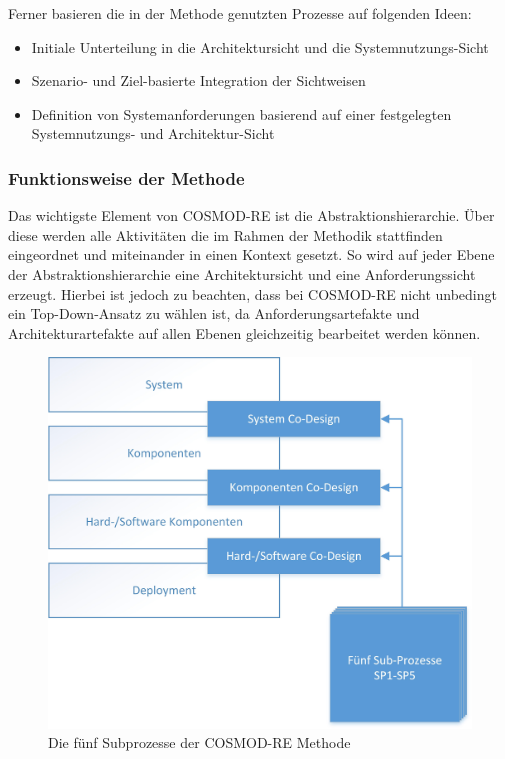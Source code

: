 Ferner basieren die in der Methode genutzten Prozesse auf folgenden Ideen: \cite{Poh01} \\

\begin{itemize}
\item Initiale Unterteilung in die Architektursicht und die Systemnutzungs-Sicht
\item Szenario- und Ziel-basierte Integration der Sichtweisen
\item Definition von Systemanforderungen basierend auf einer festgelegten Systemnutzungs- und Architektur-Sicht \\
\end{itemize}

\subsubsection{Funktionsweise der Methode}
Das wichtigste Element von COSMOD-RE ist die Abstraktionshierarchie. Über diese werden alle Aktivitäten die im Rahmen der Methodik stattfinden eingeordnet und miteinander in einen Kontext gesetzt. So wird auf jeder Ebene der Abstraktionshierarchie eine Architektursicht und eine Anforderungssicht erzeugt. Hierbei ist jedoch zu beachten, dass bei COSMOD-RE nicht unbedingt ein Top-Down-Ansatz zu wählen ist, da Anforderungsartefakte und Architekturartefakte auf allen Ebenen gleichzeitig bearbeitet werden können.\\

\begin{figure}[h]
	\centering
	\includegraphics[scale=0.75]{COSMODREoverview.jpg} 
	\caption{Die fünf Subprozesse der COSMOD-RE Methode}\label{cosmodreow}
\end{figure}

